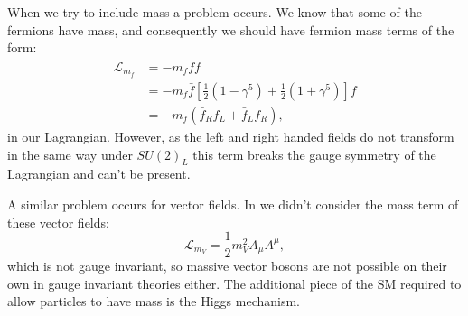 When we try to include mass a problem occurs. We know that some of the fermions have mass, and consequently we should have fermion mass terms of the form:
\begin{equation}
  \begin{split}
    \mathcal{L}_{m_{f}}&=-m_{f}\bar{f}{f} \\
    &=-m_{f}\bar{f}\left[\frac{1}{2}\left(1-\gamma^{5}\right)+\frac{1}{2}\left(1+\gamma^{5}\right)\right]f \\
    &=-m_{f}\left(\bar{f}_{R}f_{L}+\bar{f}_{L}f_{R}\right),
  \end{split}
\end{equation}
in our Lagrangian. However, as the left and right handed fields do not transform in the same way under $SU\left(2\right)_{L}$ this term breaks the gauge symmetry of the Lagrangian and can't be present. 

A similar problem occurs for vector fields. In  we didn't consider the mass term of these vector fields:
\begin{equation}
  \label{eq:vectorlagrangian}
  \mathcal{L}_{m_V}=\frac{1}{2}m_{V}^{2}A_{\mu}A^{\mu},
\end{equation}
which is not gauge invariant, so massive vector bosons are not possible on their own in gauge invariant theories either. The additional piece of the SM required to allow particles to have mass is the Higgs mechanism.

